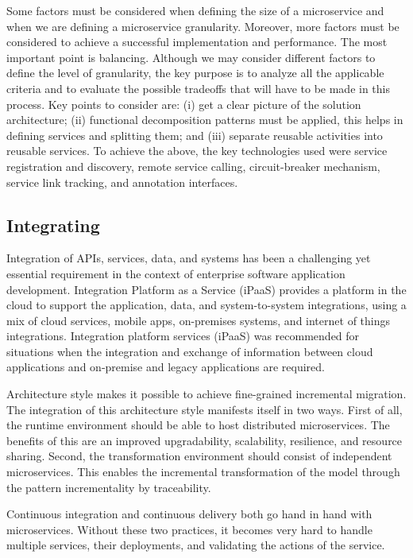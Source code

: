 Some factors must be considered when defining the size of a microservice and when we are defining a microservice granularity. Moreover, more factors must be considered to achieve a successful implementation and performance.
The most important point is balancing. Although we may consider different factors to define the level of granularity, the key purpose is to analyze all the applicable criteria and to evaluate the possible tradeoffs that will have to be made in this process. Key points to consider are:\cite{Yan2020}
(i) get a clear picture of the solution architecture;
(ii) functional decomposition patterns must be applied, this helps in defining services and splitting them;
and (iii) separate reusable activities into reusable services.
%
To achieve the above, the key technologies used were service registration and discovery, remote service calling, circuit-breaker mechanism, service link tracking, and annotation interfaces.


\subsection{Integrating}%
Integration of APIs, services, data, and systems has been a challenging yet essential requirement in the context of enterprise software application development. %
Integration Platform as a Service (iPaaS) provides a platform in the cloud to support the application, data, and system-to-system integrations, using a mix of cloud services, mobile apps, on-premises systems, and internet of things integrations. 
%
Integration platform services (iPaaS) was recommended for situations when the integration and exchange of information between cloud applications and on-premise and legacy applications are required.\cite{rosa2018}

Architecture style makes it possible to achieve fine-grained incremental migration. The integration of this architecture style manifests itself in two ways. First of all, the runtime environment should be able to host distributed microservices. The benefits of this are an improved upgradability, scalability, resilience, and resource sharing.
Second, the transformation environment should consist of independent microservices. This enables the incremental transformation of the model through the pattern incrementality by traceability.\cite{overeem2018, liu2018}

Continuous integration and continuous delivery both go hand in hand with microservices. Without these two practices, it becomes very hard to handle multiple services, their deployments, and validating the actions of the service.\cite{Kalske2017paper, Zhang2019} 





